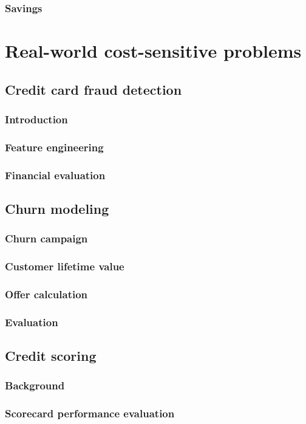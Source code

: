 \documentclass[twoside,openright,titlepage,numbers=noenddot,headinclude,%
               footinclude=true,cleardoublepage=empty,abstractoff,BCOR=5mm,%
               paper=a4,fontsize=11pt,ngerman,american]{scrreprt}
\numberwithin{theorem}{chapter}
\numberwithin{definition}{chapter}
\numberwithin{algorithm}{chapter}
\numberwithin{figure}{chapter}
\numberwithin{table}{chapter}
\numberwithin{equation}{chapter}
\begin{document}
	\section{Savings}

\part{Real-world cost-sensitive problems}
\chapter{Credit card fraud detection}
	\section{Introduction}
	\section{Feature engineering}
	\section{Financial evaluation}
	
\chapter{Churn modeling}
	\section{Churn campaign}
	\section{Customer lifetime value}
	\section{Offer calculation}
	\section{Evaluation}
	
\chapter{Credit scoring}
	\section{Background}
	\section{Scorecard performance evaluation}
	
\end{document}
